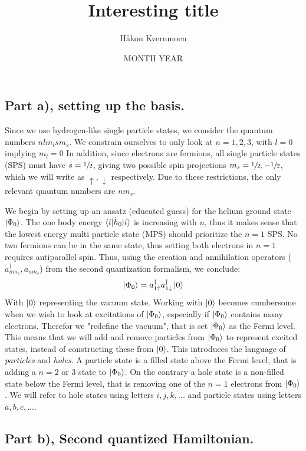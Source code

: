 \documentclass{article}
\title{Interesting title}
\author{Håkon Kvernmoen}
\date{MONTH YEAR}
\newcommand{\vac}{\ket{0}}
\newcommand{\gs}{\ket{\Phi_0}}
\newcommand{\ups}[1]{#1\uparrow}
\newcommand{\downs}[1]{#1\downarrow}
\newcommand{\inner}[3]{\braket{#1|#2|#3}}
\newcommand{\hnull}{\hat{h}_0}
\newcommand{\crt}[1]{a_{#1}^{\dagger}}
\newcommand{\ani}[1]{a_{#1}}
\begin{document}
\maketitle

\subsection*{Part a), setting up the basis.}
    Since we use hydrogen-like single particle states, we consider the quantum numbers $nlm_l sm_s$. We constrain ourselves to only look at $n = 1,2,3$, with $l = 0$ implying $m_l = 0$ In addition, since electrons are fermions, all single particle states (SPS) must have $s = \sfrac{1}{2}$, giving two possible spin projections $m_s = \sfrac{1}{2}, -\sfrac{1}{2}$, which we will write as $\uparrow, \downarrow$ respectively. Due to these restrictions, the only relevant quantum numbers are $nm_s$.       
    
    We begin by setting up an ansatz (educated guess) for the helium ground state $\gs$. The one body energy $\inner{i}{\hnull}{i}$ is increasing with $n$, thus it makes sense that the lowest energy multi particle state (MPS) should prioritize the $n = 1$ SPS. No two fermions can be in the same state, thus setting both electrons in $n = 1$ requires antiparallel spin. Thus, using the creation and annihilation operators ($\crt{nm_s}, \ani{nm_s}$) from the second quantization formalism, we conclude:   
    \begin{align*}
        \gs = \crt{\ups{1}}\crt{\downs{1}}\vac
    \end{align*}
    With $\vac$ representing the vacuum state. Working with $\vac$ becomes cumbersome when we wish to look at excitations of $\gs$, especially if $\gs$ contains many electrons. Therefor we "redefine the vacuum", that is set $\gs$ as the Fermi level. This means that we will add and remove particles from $\gs$ to represent excited states, instead of constructing these from $\vac$. This introduces the language of \textit{particles} and \textit{holes}. A particle state is a filled state above the Fermi level, that is adding a $n = 2$ or $3$ state to $\gs$. On the contrary a hole state is a non-filled state below the Fermi level, that is removing one of the $n = 1$ electrons from $\gs$. We will refer to hole states using letters $i,j,k, ...$ and particle states using letters $a,b,c,...$.          

\subsection*{Part b), Second quantized Hamiltonian.}
\end{document}
